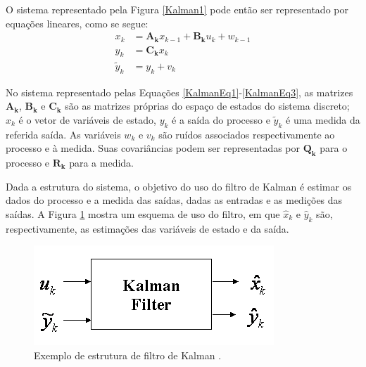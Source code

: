 O sistema representado pela Figura \ref{Kalman1} pode então ser representado por equações lineares, como se segue:
\begin{align}
	\label{KalmanEq1}
	x_k &= \mathbf{A_k} x_{k-1} + \mathbf{B_k} u_k + w_{k-1} \\
	\label{KalmanEq2}
	y_k &= \mathbf{C_k} x_k \\
	\label{KalmanEq3}
	\tilde{y}_k &= y_k + v_k
\end{align}

No sistema representado pelas Equações \ref{KalmanEq1}-\ref{KalmanEq3}, as matrizes $\mathbf{A_k}$, $\mathbf{B_k}$ e $\mathbf{C_k}$ são as matrizes próprias do espaço de estados do sistema discreto; $x_k$ é o vetor de variáveis de estado, $y_k$ é a saída do processo e $\tilde{y}_k$ é uma medida da referida saída. As variáveis $w_k$ e $v_k$ são ruídos associados respectivamente ao processo e à medida. Suas covariâncias podem ser representadas por $\mathbf{Q_k}$ para o processo e $\mathbf{R_k}$ para a medida.

Dada a estrutura do sistema, o objetivo do uso do filtro de Kalman é estimar os dados do processo e a medida das saídas, dadas as entradas e as medições das saídas. A Figura \ref{Kalman2} mostra um esquema de uso do filtro, em que $\hat{x}_k$ e $\hat{y}_k$ são, respectivamente, as estimações das variáveis de estado e da saída.
\begin{figure}[!ht]
\centering
\caption{Exemplo de estrutura de filtro de Kalman \cite{GoddardKalman}. \label{Kalman2}}
\includegraphics[width=.7\linewidth]{figs/kalman/kalman2}
\end{figure}

